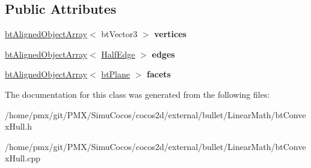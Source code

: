 \subsection*{Public Attributes}
\begin{DoxyCompactItemize}
\item 
\mbox{\label{classConvexH_a2bbdf834f8b48c2fa2763fc160fd32e1}} 
\hyperlink{classbtAlignedObjectArray}{bt\+Aligned\+Object\+Array}$<$ bt\+Vector3 $>$ {\bfseries vertices}
\item 
\mbox{\label{classConvexH_a1632369cf06ed5ac5691f5f5c889e6f2}} 
\hyperlink{classbtAlignedObjectArray}{bt\+Aligned\+Object\+Array}$<$ \hyperlink{classConvexH_1_1HalfEdge}{Half\+Edge} $>$ {\bfseries edges}
\item 
\mbox{\label{classConvexH_ab698786b218468fdc14a828d7bf03ea3}} 
\hyperlink{classbtAlignedObjectArray}{bt\+Aligned\+Object\+Array}$<$ \hyperlink{classbtPlane}{bt\+Plane} $>$ {\bfseries facets}
\end{DoxyCompactItemize}


The documentation for this class was generated from the following files\+:\begin{DoxyCompactItemize}
\item 
/home/pmx/git/\+P\+M\+X/\+Simu\+Cocos/cocos2d/external/bullet/\+Linear\+Math/bt\+Convex\+Hull.\+h\item 
/home/pmx/git/\+P\+M\+X/\+Simu\+Cocos/cocos2d/external/bullet/\+Linear\+Math/bt\+Convex\+Hull.\+cpp\end{DoxyCompactItemize}
